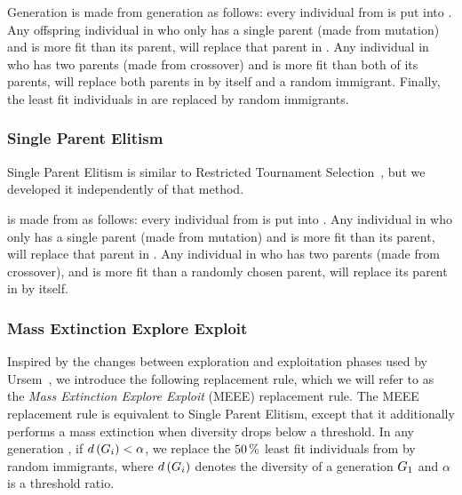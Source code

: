 Generation  is made from generation  as follows: every individual from  is put into . Any offspring individual in  who only has a single parent (made from mutation) and is more fit than its parent, will replace that parent in . Any individual in  who has two parents (made from crossover) and is more fit than both of its parents, will replace both parents in  by itself and a random immigrant. Finally, the  least fit individuals in  are replaced by random immigrants.

\subsubsection{Single Parent Elitism}
Single Parent Elitism is similar to Restricted Tournament Selection~\cite{Luke2013Metaheuristics}, but we developed it independently of that method.

 is made from  as follows: every individual from  is put into . Any individual in  who only has a single parent (made from mutation) and is more fit than its parent, will replace that parent in . Any individual in  who has two parents (made from crossover), and is more fit than a randomly chosen parent, will replace its parent in  by itself.

\subsubsection{Mass Extinction Explore Exploit}
Inspired by the changes between exploration and exploitation phases used by Ursem~\cite{ursem2002diversity}, we introduce the following replacement rule, which we will refer to as the \emph{Mass Extinction Explore Exploit} (MEEE) replacement rule. The MEEE replacement rule is equivalent to Single Parent Elitism, except that it additionally performs a mass extinction when diversity drops below a threshold. In any generation , if $d\left(G_{i}\right) < \alpha$, we replace the $\SI{50}{\percent}$ least fit individuals from  by random immigrants, where $d\left(G_i\right)$ denotes the diversity of a generation $G_{1}$ and $\alpha$ is a threshold ratio.

